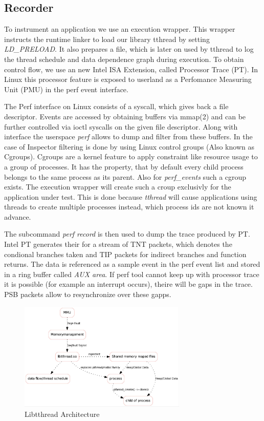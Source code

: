 \subsection{Recorder}


To instrument an application we use an execution wrapper. This wrapper instructs
the runtime linker to load our library tthread by setting \emph{LD\_PRELOAD}. It
also prepares a file, which is later on used by tthread to log the thread
schedule and data dependence graph during execution. To obtain control flow,
we use an new Intel ISA Extension, called Processor Trace (PT).
In Linux this processor feature is exposed to userland as a Perfomance Measuring
Unit (PMU) in the perf event interface.

The Perf interface on Linux consists of a syscall, which gives back a file
descriptor. Events are accessed by obtaining buffers via mmap(2) and can be
further controlled via ioctl syscalls on the given file descriptor. Along with
interface the userspace \emph{perf} allows to dump and filter from these
buffers. In the case of Inspector filtering is done by using Linux control
groups (Also known as Cgroups). Cgroups are a kernel feature to apply constraint
like resource usage to a group of processes. It has the property, that by
default every child process belongs to the same process as its parent. Also for
\emph{perf\_events} such a cgroup exists. The execution wrapper will create such
a croup exclusivly for the application under test. This is done because
\emph{tthread} will cause applications using threads to create multiple
processes instead, which process ids are not known it advance.

The subcommand \emph{perf record} is then used to dump the trace produced by PT.
Intel PT generates their for a stream of TNT packets, which denotes the
condional branches taken and TIP packets for indirect branches and function
returns. The data is referenced as a sample event in the perf event list and
stored in a ring buffer called \emph{AUX area}. If perf tool cannot
keep up with processor trace it is possible (for example an interrupt occurs),
theire will be gaps in the trace. PSB packets allow to resynchronize over these
gapps.

\begin{figure}[h]
\includegraphics[width=8cm]{figure/arch.jpg}
\caption{Libtthread Architecture}
\label{fig:tthread}
\end{figure}

